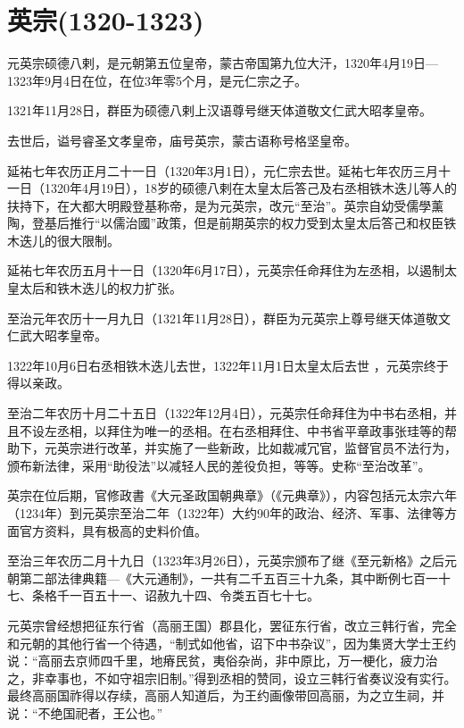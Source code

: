 
\section{英宗\tiny(1320-1323)}

元英宗硕德八剌，是元朝第五位皇帝，蒙古帝国第九位大汗，1320年4月19日—1323年9月4日在位，在位3年零5个月，是元仁宗之子。

1321年11月28日，群臣为硕德八剌上汉语尊号继天体道敬文仁武大昭孝皇帝。

去世后，谥号睿圣文孝皇帝，庙号英宗，蒙古语称号格坚皇帝。

延祐七年农历正月二十一日（1320年3月1日），元仁宗去世。延祐七年农历三月十一日（1320年4月19日），18岁的硕德八剌在太皇太后答己及右丞相铁木迭儿等人的扶持下，在大都大明殿登基称帝，是为元英宗，改元“至治”。英宗自幼受儒學薰陶，登基后推行“以儒治國”政策，但是前期英宗的权力受到太皇太后答己和权臣铁木迭儿的很大限制。

延祐七年农历五月十一日（1320年6月17日），元英宗任命拜住为左丞相，以遏制太皇太后和铁木迭儿的权力扩张。

至治元年农历十一月九日（1321年11月28日），群臣为元英宗上尊号继天体道敬文仁武大昭孝皇帝。

1322年10月6日右丞相铁木迭儿去世，1322年11月1日太皇太后去世 ，元英宗终于得以亲政。

至治二年农历十月二十五日（1322年12月4日），元英宗任命拜住为中书右丞相，并且不设左丞相，以拜住为唯一的丞相。在右丞相拜住、中书省平章政事张珪等的帮助下，元英宗进行改革，并实施了一些新政，比如裁减冗官，监督官员不法行为，颁布新法律，采用“助役法”以减轻人民的差役负担，等等。史称“至治改革”。

英宗在位后期，官修政書《大元圣政国朝典章》（《元典章》），内容包括元太宗六年（1234年）到元英宗至治二年（1322年）大约90年的政治、经济、军事、法律等方面官方资料，具有极高的史料价值。

至治三年农历二月十九日（1323年3月26日），元英宗颁布了继《至元新格》之后元朝第二部法律典籍—《大元通制》，一共有二千五百三十九条，其中断例七百一十七、条格千一百五十一、诏赦九十四、令类五百七十七。

元英宗曾经想把征东行省（高丽王国）郡县化，罢征东行省，改立三韩行省，完全和元朝的其他行省一个待遇，“制式如他省，诏下中书杂议”，因为集贤大学士王约说：“高丽去京师四千里，地瘠民贫，夷俗杂尚，非中原比，万一梗化，疲力治之，非幸事也，不如守祖宗旧制。”得到丞相的赞同，设立三韩行省奏议没有实行。最终高丽国祚得以存续，高丽人知道后，为王约画像带回高丽，为之立生祠，并说：“不绝国祀者，王公也。”

